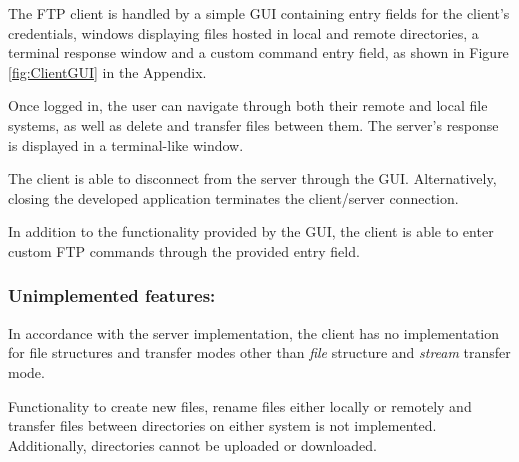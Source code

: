 \documentclass[10pt,twocolumn]{witseiepaper}
\begin{document}
The FTP client is handled by a simple GUI containing entry fields for the client's credentials, windows displaying files hosted in local and remote directories, %
a terminal response window and a custom command entry field, as shown in Figure \ref{fig:ClientGUI} in the Appendix.



Once logged in, the user can navigate through both their remote and local file systems, as well as delete and transfer files between them. The server's response is displayed in a terminal-like window. 

The client is able to disconnect from the server through the GUI. Alternatively, closing the developed application terminates the client/server connection.

In addition to the functionality provided by the GUI, the client is able to enter custom FTP commands through the provided entry field. 


\vspace*{-\baselineskip}
\subsubsection*{Unimplemented features: } 
In accordance with the server implementation, the client has no implementation for file structures and transfer modes other than \textit{file} structure and \textit{stream} transfer mode.

Functionality to create new files, rename files either locally or remotely and transfer files between directories on either system is not implemented. Additionally, directories cannot be uploaded or downloaded.
\end{document}
